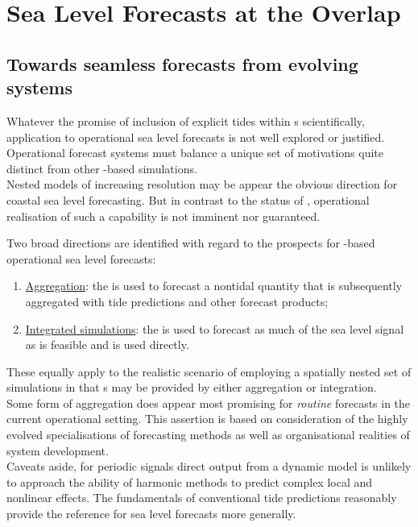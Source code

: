 \section{Sea Level Forecasts at the Overlap}
\label{S:fc_prospects}


\subsection{Towards seamless forecasts from evolving systems}

Whatever the promise of inclusion of explicit tides within \OGCM{}s scientifically, application to operational sea level forecasts is not well explored or justified.
Operational forecast systems must balance a unique set of motivations quite distinct from other \OGCM{}-based simulations.  \\
Nested models of increasing resolution may be appear the obvious direction for coastal sea level forecasting.  But in contrast to the status of \BL{}, operational realisation of such a capability is not imminent nor guaranteed.


Two broad directions are identified with regard to the prospects for \OGCM{}-based operational sea level forecasts:
\begin{enumerate}
\item \underline{Aggregation}: the \OGCM{} is used to forecast a nontidal quantity that is subsequently aggregated with tide predictions and other forecast products;
\item \underline{Integrated simulations}: the \OGCM{} is used to forecast as much of the sea level signal as is feasible and is used directly.
\end{enumerate}
These equally apply to the realistic scenario of employing a spatially nested set of simulations in that \obc{}s may be provided by either aggregation or integration.\\


Some form of aggregation does appear most promising for \emph{routine} forecasts in the current operational setting.  
This assertion is based on consideration of the highly evolved specialisations of forecasting methods as well as organisational realities of system development.\\
Caveats aside, for periodic signals direct output from a dynamic model is unlikely to approach the ability of harmonic methods to predict complex local and nonlinear effects.   The fundamentals of conventional tide predictions reasonably provide the reference for sea level forecasts more generally. \\



